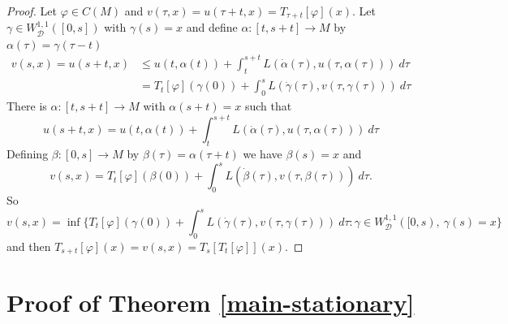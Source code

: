 \documentclass[12pt]{amsart}
\theoremstyle{plain}
\theoremstyle{definition}
\newcommand{\cD}{\mathcal D}
\newcommand{\cW}{W^{1,1}}
\newcommand{\cWD}{\cW_\cD}
\newcommand{\af}{\alpha}
\newcommand{\fui}{\varphi}
\newcommand{\be}{\beta}
\newcommand{\ga}{\gamma}
\newcommand{\dga}{\dot\gamma}
\begin{document}
  \begin{proof} Let $\fui\in C(M)$ and 
    $v(\tau,x)=u(\tau+t,x)=T_{\tau+t}[\fui](x).$
      Let $\ga\in\cWD([0,s])$ with $\ga(s)=x$ and define $\af:[t,s+t]\to M$
    by $\af(\tau)=\ga(\tau-t)$
    \begin{align*}
    v(s,x)=u(s+t,x)&\le
      u(t,\af(t))+\int_t^{s+t}L(\dot\af(\tau),u(\tau,\af(\tau)))\ d\tau\\
     &= T_t[\fui](\ga(0)) +\int_0^sL(\dga(\tau),v(\tau,\ga(\tau)))\ d\tau
    \end{align*}
      There is $\af:[t,s+t]\to M$ with $\af(s+t)=x$ such that
     \[u(s+t,x)= u(t,\af(t))+\int_t^{s+t}L(\dot\af(\tau),u(\tau,\af(\tau)))\  d\tau\]
    Defining $\be:[0,s]\to M$ by $\be(\tau)=\af(\tau+t)$ we have $\be(s)=x$ and
     \[v(s,x)= T_t[\fui](\be(0)) +\int_0^sL(\dot\be(\tau),v(\tau,\be(\tau)))\ d\tau.\]
     So 
     \[ v(s,x)=\inf\{T_t[\fui](\ga(0))
       +\int_0^sL(\dga(\tau),v(\tau,\ga(\tau)))\ d\tau:\ga\in\cWD([0,s),\ \ga(s)=x\}\]
and then $T_{s+t}[\fui](x)=v(s,x)=T_s[T_t[\fui]](x)$.
\end{proof}
\section{Proof of Theorem \ref{main-stationary}}
\end{document}
